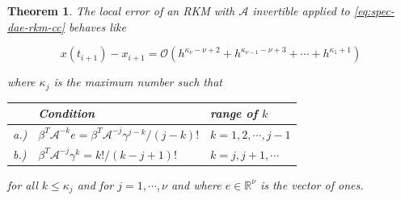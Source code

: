 \documentclass[]{book}
\newtheorem{theorem}{Theorem}[chapter]
\theoremstyle{definition}
\theoremstyle{definition}
\theoremstyle{definition}
\theoremstyle{definition}
\theoremstyle{remark}
\begin{document}
\begin{theorem}
\protect\hypertarget{thm:v-local-consistency-error-rkm-lcc}{}{\label{thm:v-local-consistency-error-rkm-lcc} }The local error of an RKM with \(\mathcal A\) invertible applied to \eqref{eq:spec-dae-rkm-cc} behaves like

\[
x(t_{i+1}) - x_{i+1} = \mathcal O(h^{\kappa_\nu - \nu + 2} + h^{\kappa_{\nu-1} - \nu + 3} + \cdots + h^{\kappa_1 +1})
\]

where \(\kappa_j\) is the maximum number such that

\begin{longtable}[]{@{}lll@{}}
\toprule
\begin{minipage}[b]{0.07\columnwidth}\raggedright
\strut
\end{minipage} & \begin{minipage}[b]{0.53\columnwidth}\raggedright
Condition\strut
\end{minipage} & \begin{minipage}[b]{0.31\columnwidth}\raggedright
range of \(k\)\strut
\end{minipage}\tabularnewline
\midrule
\endhead
\begin{minipage}[t]{0.07\columnwidth}\raggedright
a.)\strut
\end{minipage} & \begin{minipage}[t]{0.53\columnwidth}\raggedright
\(\beta^T\mathcal A^{-k}e = \beta^T\mathcal A^{-j}\gamma^{j-k} / (j-k)!\)\strut
\end{minipage} & \begin{minipage}[t]{0.31\columnwidth}\raggedright
\(k=1,2,\cdots,j-1\)\strut
\end{minipage}\tabularnewline
\begin{minipage}[t]{0.07\columnwidth}\raggedright
b.)\strut
\end{minipage} & \begin{minipage}[t]{0.53\columnwidth}\raggedright
\(\beta^T\mathcal A^{-j}\gamma^k = k! / (k-j+1)!\)\strut
\end{minipage} & \begin{minipage}[t]{0.31\columnwidth}\raggedright
\(k=j,j+1,\cdots\)\strut
\end{minipage}\tabularnewline
\bottomrule
\end{longtable}

for all \(k\leq \kappa_j\) and for \(j=1, \cdots, \nu\) and where \(e\in \mathbb R^{\nu}\) is the vector of ones.
\end{theorem}
\end{document}
